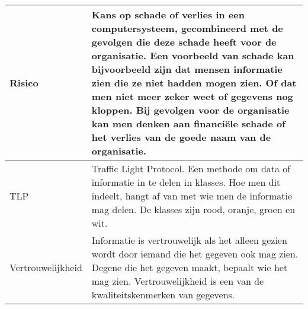 \documentclass[11pt, a4paper]{report}
\begin{document}
\begin{longtable}{ p{}  p{} }
		Risico & Kans op schade of verlies in een computersysteem, gecombineerd met de gevolgen die deze schade heeft voor de organisatie. Een voorbeeld van schade kan bijvoorbeeld zijn dat mensen informatie zien die ze niet hadden mogen zien. Of dat men niet meer zeker weet of gegevens nog kloppen. Bij gevolgen voor de organisatie kan men denken aan financiële schade of het verlies van de goede naam van de organisatie. \\ \midrule

		TLP & Traffic Light Protocol. Een methode om data of informatie in te delen in klasses. Hoe men dit indeelt, hangt af van met wie men de informatie mag delen. De klasses zijn rood, oranje, groen en wit. \\ \midrule

		Vertrouwelijkheid & Informatie is vertrouwelijk als het alleen gezien wordt door iemand die het gegeven ook mag zien. Degene die het gegeven maakt, bepaalt wie het mag zien. Vertrouwelijkheid is een van de kwaliteitskenmerken van gegevens. \\ \midrule

	\bottomrule
\end{longtable}
\end{document}
